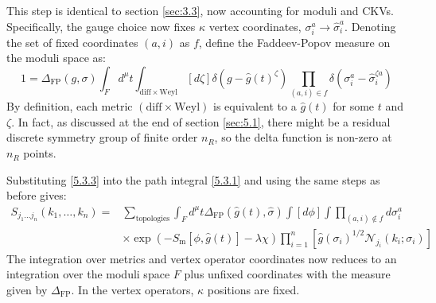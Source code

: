 This step is identical to section \ref{sec:3.3}, now accounting for moduli and CKVs. Specifically, the gauge choice now fixes $\kappa$ vertex coordinates, $\sigma_{i}^{a} \rightarrow \hat{\sigma}_{i}^{a}$. Denoting the set of fixed coordinates $(a, i)$ as $f$, define the Faddeev-Popov measure on the moduli space as:
\begin{equation}
	1=\Delta_{\mathrm{FP}}(g, \sigma) \int_{F} d^{\mu} t \int_{\mathrm{diff} \times \mathrm{Weyl}}[d \zeta] \delta\left(g-\hat{g}(t)^{\zeta}\right) \prod_{(a, i) \in f} \delta\left(\sigma_{i}^{a}-\hat{\sigma}_{i}^{\zeta a}\right)\label{5.3.3}
\end{equation}
By definition, each metric $(\text{diff} \times \text{Weyl})$ is equivalent to a $\hat{g}(t)$ for some $t$ and $\zeta$. In fact, as discussed at the end of section \ref{sec:5.1}, there might be a residual discrete symmetry group of finite order $n_{R}$, so the delta function is non-zero at $n_{R}$ points.

Substituting \eqref{5.3.3} into the path integral \eqref{5.3.1} and using the same steps as before gives:
\begin{equation}
	\begin{aligned}
		S_{j_{1} \ldots j_{n}}\left(k_{1}, \ldots, k_{n}\right)=& \sum_{\text {topologies}} \int_{F} d^{\mu} t \Delta_{\mathrm{FP}}(\hat{g}(t), \hat{\sigma}) \int[d \phi] \int \prod_{(a, i) \notin f} d \sigma_{i}^{a} \\	
		&\times \exp \left(-S_{\mathrm{m}}[\phi, \hat{g}(t)]-\lambda \chi\right) \prod_{i=1}^{n}\left[\hat{g}\left(\sigma_{i}\right)^{1 / 2} \mathscr{N}_{j_{i}}\left(k_{i} ; \sigma_{i}\right)\right]
	\end{aligned}\label{5.3.4}
\end{equation}
The integration over metrics and vertex operator coordinates now reduces to an integration over the moduli space $F$ plus unfixed coordinates with the measure given by $\Delta_{\mathrm{FP}}$. In the vertex operators, $\kappa$ positions are fixed.

